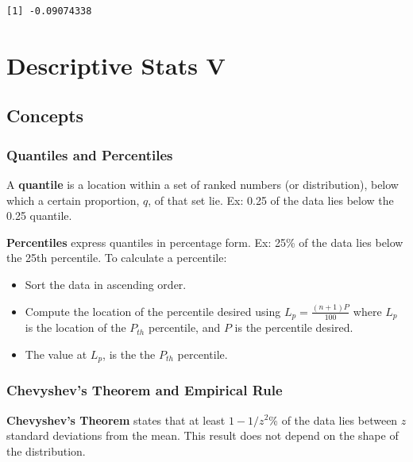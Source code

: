 \documentclass[
  letterpaper,
  DIV=11,
  numbers=noendperiod]{scrreprt}
\begin{document}
\begin{verbatim}
[1] -0.09074338
\end{verbatim}

\hypertarget{descriptive-stats-v}{%
\chapter{Descriptive Stats V}\label{descriptive-stats-v}}

\hypertarget{concepts-4}{%
\section{Concepts}\label{concepts-4}}

\hypertarget{quantiles-and-percentiles}{%
\subsection*{Quantiles and
Percentiles}\label{quantiles-and-percentiles}}

A \textbf{quantile} is a location within a set of ranked numbers (or
distribution), below which a certain proportion, \(q\), of that set lie.
Ex: 0.25 of the data lies below the 0.25 quantile.

\textbf{Percentiles} express quantiles in percentage form. Ex: 25\% of
the data lies below the 25th percentile. To calculate a percentile:

\begin{itemize}
\item
  Sort the data in ascending order.
\item
  Compute the location of the percentile desired using
  \(L_{p}=\frac{(n+1)P}{100}\) where \(L_{p}\) is the location of the
  \(P_{th}\) percentile, and \(P\) is the percentile desired.
\item
  The value at \(L_p\), is the the \(P_{th}\) percentile.
\end{itemize}

\hypertarget{chevyshevs-theorem-and-empirical-rule}{%
\subsection*{Chevyshev's Theorem and Empirical
Rule}\label{chevyshevs-theorem-and-empirical-rule}}

\textbf{Chevyshev's Theorem} states that at least \(1-1/z^2\)\% of the
data lies between \(z\) standard deviations from the mean. This result
does not depend on the shape of the distribution.
\end{document}
